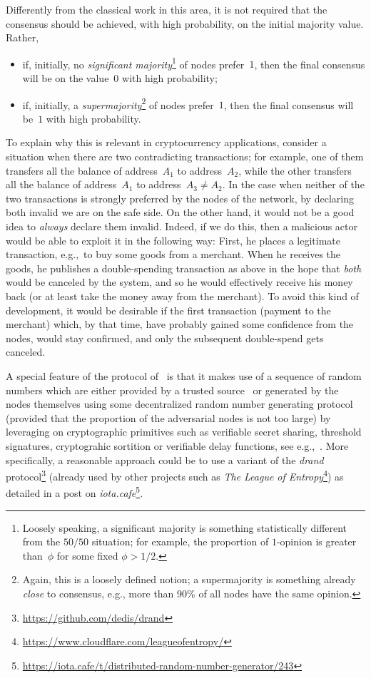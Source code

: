 \documentclass[../main.tex]{subfiles}
\begin{document}
Differently from the classical work
in this area, 
it is not required that
the consensus should be achieved, with high probability, on the initial majority
value.
Rather, 
\begin{itemize}
 \item if, initially, no 
 \emph{significant majority}\footnote{Loosely speaking,
 a significant majority is something statistically 
 different from the $50/50$ situation; for example,
 the proportion of $1$-opinion is greater than~$\phi$
 for some fixed $\phi>1/2$.} 
 of nodes prefer~$1$,
 then the final consensus will be on the value~$0$ 
with high probability;
 \item if, initially, a 
 \emph{supermajority}\footnote{Again, this is 
 a loosely defined notion; 
 a supermajority is something already \emph{close}
 to consensus, e.g., more than 90\% of all nodes 
 have the same opinion.}
 of nodes prefer~$1$,
 then the final consensus will be~$1$ with high probability.
\end{itemize}
To explain why this is relevant in cryptocurrency 
applications, consider a situation when there 
are two contradicting transactions;
for example, one of them transfers all the balance of 
address~$A_1$ to address~$A_2$, while the other
transfers all the balance of 
address~$A_1$ to address~$A_3\neq A_2$.
In the case when neither of the two transactions
is strongly preferred by the nodes of the network,
by declaring both invalid we are on the safe side.
On the other hand, it would not be a good idea to \emph{always}
declare them invalid. Indeed, if we do this, 
then a malicious actor would be able to 
exploit it in the following
way: First, he places a legitimate transaction, e.g.,\
to buy some goods from a merchant. When he receives 
the goods, he publishes a double-spending transaction
as above in the hope that \emph{both} would be
canceled by the system, and so he would effectively
receive his money back (or at least take
the money away from the merchant). To avoid this kind
of development, it would be desirable if the first
transaction (payment to the merchant) which,
by that time, have probably gained some confidence 
 from the nodes, would stay confirmed,
and only the subsequent double-spend gets canceled.




A special feature of the protocol of~\cite{popov2019} is that it makes 
use of a sequence of random numbers which are either
provided by a trusted source~\cite{nist:2019} or generated
by the nodes themselves using some
decentralized random number generating protocol 
(provided that the proportion of the adversarial nodes is not too large) 
by leveraging on cryptographic primitives such as verifiable secret sharing, 
threshold signatures, cryptograhic sortition or verifiable delay functions,
see e.g.,~\cite{cascudo2017, popov2017, schindler2018, syta2017, gilad2017algorand, boneh2018}.
More specifically, a reasonable approach could be to use a variant of the \emph{drand} protocol\footnote{\url{https://github.com/dedis/drand}} (already used by other projects such as \emph{The League of Entropy}\footnote{\url{https://www.cloudflare.com/leagueofentropy/}}) as detailed in a post on \emph{iota.cafe}\footnote{\url{https://iota.cafe/t/distributed-random-number-generator/243}}.
%
\end{document}
